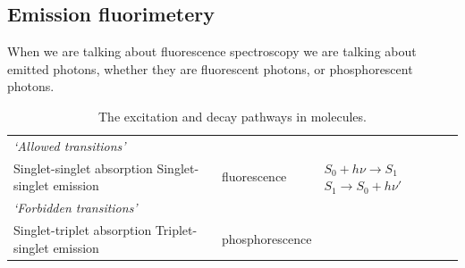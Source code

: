 \documentclass[
]{book}
\begin{document}
\hypertarget{emission-fluorimetery}{%
\subsection{Emission fluorimetery}\label{emission-fluorimetery}}

When we are talking about fluorescence spectroscopy we are talking about emitted photons, whether they are fluorescent photons, or phosphorescent photons.

\begin{longtable}[]{@{}lll@{}}
\caption{\label{tab:phototrans} The excitation and decay pathways in molecules.}\tabularnewline
\toprule
\endhead
\begin{minipage}[t]{0.39\columnwidth}\raggedright
\emph{`Allowed transitions'}\strut
\end{minipage} & \begin{minipage}[t]{0.26\columnwidth}\raggedright
\strut
\end{minipage} & \begin{minipage}[t]{0.26\columnwidth}\raggedright
\strut
\end{minipage}\tabularnewline
\begin{minipage}[t]{0.39\columnwidth}\raggedright
Singlet-singlet absorption Singlet-singlet emission\strut
\end{minipage} & \begin{minipage}[t]{0.26\columnwidth}\raggedright
fluorescence\strut
\end{minipage} & \begin{minipage}[t]{0.26\columnwidth}\raggedright
\(S_0 + h \nu \longrightarrow S_1\) \(S_1 \longrightarrow S_0 + h \nu '\)\strut
\end{minipage}\tabularnewline
\begin{minipage}[t]{0.39\columnwidth}\raggedright
\emph{`Forbidden transitions'}\strut
\end{minipage} & \begin{minipage}[t]{0.26\columnwidth}\raggedright
\strut
\end{minipage} & \begin{minipage}[t]{0.26\columnwidth}\raggedright
\strut
\end{minipage}\tabularnewline
\begin{minipage}[t]{0.39\columnwidth}\raggedright
Singlet-triplet absorption Triplet-singlet emission\strut
\end{minipage} & \begin{minipage}[t]{0.26\columnwidth}\raggedright
phosphorescence\strut

\end{minipage}
\end{longtable}
\end{document}
